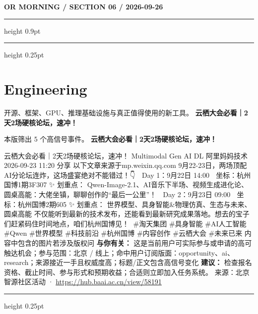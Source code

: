 \documentclass[10.5pt]{ctexart}
\begin{document}
\newpage
{\small\bfseries OR MORNING / SECTION 06 / 2026-09-26}
\vspace{2mm}
\hrule height 0.9pt
\vspace{1.5mm}
\hrule height 0.25pt
\vspace{4mm}
\section*{Engineering}
{\color{ormuted} 开源、框架、GPU、推理基础设施与真正值得使用的新工具。}
\vspace{2mm}
{\LARGE\bfseries 云栖大会必看｜2天2场硬核论坛，速冲！}\par
\vspace{1mm}
{\color{ormuted} 本版筛出 5 个高信号事件。}
\vspace{3mm}
{\Large\bfseries 云栖大会必看｜2天2场硬核论坛，速冲！}\par
云栖大会必看｜2天2场硬核论坛，速冲！ Multimodal Gen AI DL 阿里妈妈技术 2026-09-23 11:20 分享 以下文章来源于mp.weixin.qq.com 9月22-23日，两场顶配AI分论坛连炸，这场盛宴绝对不能错过！👇 🎨 Day 1：9月22日 14:00 📍 坐标：杭州国博1期3F307 ✨ 划重点： Qwen-Image-2.1、AI音乐下半场、视频生成进化论、圆桌高能：大佬坐镇，聊聊创作的“最后一公里”！ 🎨 Day 2：9月23日 09:00 📍 坐标：杭州国博2期605 ✨ 划重点： 世界模型、具身智能\&物理仿真、生态与未来、圆桌高能 不仅能听到最新的技术发布，还能看到最新研究成果落地。想去的宝子们赶紧码住时间地点，咱们杭州国博见！👋 \#淘天集团 \#具身智能 \#AI人工智能 \#Qwen \#世界模型 \#科技前沿 \#杭州国博 \#内容创作 \#云栖大会 \#未来已来 内容中包含的图片若涉及版权问
\textbf{与你有关：} 这是当前用户可实际参与或申请的高可触达机会；参与范围：北京 / 线上；命中用户订阅版面：opportunity、ai、research；来源接近一手且权威度高；标题/正文包含高信号变化
\textbf{建议：} 检查报名资格、截止时间、参与形式和预期收益；合适则立即加入任务系统。
{\footnotesize\color{ormuted} 来源：北京智源社区活动 · \url{https://hub.baai.ac.cn/view/58191}}
\vspace{4mm}
\hrule height 0.25pt
\vspace{3mm}
\end{document}
